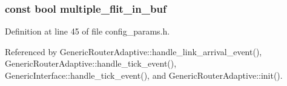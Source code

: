 \subsubsection[{multiple\_\-flit\_\-in\_\-buf}]{\setlength{\rightskip}{0pt plus 5cm}const bool {\bf multiple\_\-flit\_\-in\_\-buf}}\label{genericInterface_8h_6e9030ac7a1abb7387b696f49bcf0fde}




Definition at line 45 of file config\_\-params.h.

Referenced by GenericRouterAdaptive::handle\_\-link\_\-arrival\_\-event(), GenericRouterAdaptive::handle\_\-tick\_\-event(), GenericInterface::handle\_\-tick\_\-event(), and GenericRouterAdaptive::init().